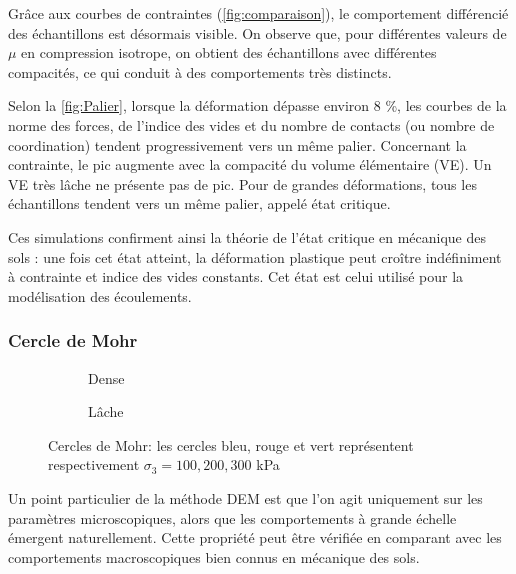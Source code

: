 \documentclass[a4paper,12pt]{report}
\begin{document}
Grâce aux courbes de contraintes (\autoref{fig:comparaison}), le comportement différencié des échantillons est désormais visible.  
On observe que, pour différentes valeurs de $\mu$ en compression isotrope, on obtient des échantillons avec différentes compacités, ce qui conduit à des comportements très distincts.  

Selon la \autoref{fig:Palier}, lorsque la déformation dépasse environ 8  \%, les courbes de la norme des forces, de l’indice des vides et du nombre de contacts (ou nombre de coordination) tendent progressivement vers un même palier.  
Concernant la contrainte, le pic augmente avec la compacité du volume élémentaire (VE). Un VE très lâche ne présente pas de pic. Pour de grandes déformations, tous les échantillons tendent vers un même palier, appelé état critique.  

Ces simulations confirment ainsi la théorie de l’état critique en mécanique des sols : une fois cet état atteint, la déformation plastique peut croître indéfiniment à contrainte et indice des vides constants.  
Cet état est celui utilisé pour la modélisation des écoulements.

\subsubsection{Cercle de Mohr}

\begin{figure}[h!]
    \centering
    \begin{subfigure}[b]{0.48\textwidth}
        \centering
        \scalebox{0.6}{}
        \caption{Dense}
        \label{fig:cercle_dense}
    \end{subfigure}
    \hfill
    \begin{subfigure}[b]{0.48\textwidth}
        \centering
        \scalebox{0.65}{}
        \caption{Lâche}
        \label{fig:cercle_lache}
    \end{subfigure}
    \caption{Cercles de Mohr: les cercles bleu, rouge et vert représentent respectivement $\sigma_3 = 100, 200, 300$ kPa}
    \label{fig:CercleDuMohr}
\end{figure}

Un point particulier de la méthode DEM est que l’on agit uniquement sur les paramètres microscopiques, alors que les comportements à grande échelle émergent naturellement.  
Cette propriété peut être vérifiée en comparant avec les comportements macroscopiques bien connus en mécanique des sols.  
\end{document}
